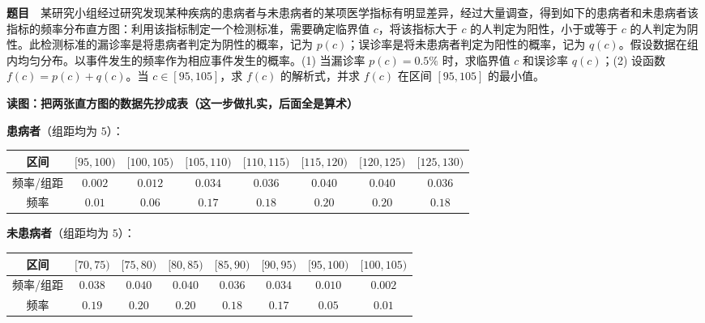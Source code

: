 \par\medskip


\textbf{题目}　某研究小组经过研究发现某种疾病的患病者与未患病者的某项医学指标有明显差异，经过大量调查，得到如下的患病者和未患病者该指标的频率分布直方图：利用该指标制定一个检测标准，需要确定临界值 $c$，将该指标大于 $c$ 的人判定为阳性，小于或等于 $c$ 的人判定为阴性。此检测标准的漏诊率是将患病者判定为阴性的概率，记为 $p(c)$；误诊率是将未患病者判定为阳性的概率，记为 $q(c)$。假设数据在组内均匀分布。以事件发生的频率作为相应事件发生的概率。(1) 当漏诊率 $p(c)=0.5\%$ 时，求临界值 $c$ 和误诊率 $q(c)$；(2) 设函数 $f(c)=p(c)+q(c)$。当 $c\in[95,105]$，求 $f(c)$ 的解析式，并求 $f(c)$ 在区间 $[95,105]$ 的最小值。

\begin{center}\end{center}

\par\medskip

\textbf{读图：把两张直方图的数据先抄成表（这一步做扎实，后面全是算术）}

\textbf{患病者}（组距均为 $5$）：

\begin{center}
\begingroup\setlength{\tabcolsep}{4pt}
\begin{tabular}{cccccccc}
\toprule
区间 & $[95,100)$ & $[100,105)$ & $[105,110)$ & $[110,115)$ & $[115,120)$ & $[120,125)$ & $[125,130)$ \\
\midrule
频率/组距 & $0.002$ & $0.012$ & $0.034$ & $0.036$ & $0.040$ & $0.040$ & $0.036$ \\
频率 & $0.01$ & $0.06$ & $0.17$ & $0.18$ & $0.20$ & $0.20$ & $0.18$ \\
\bottomrule
\end{tabular}
\endgroup
\end{center}

\textbf{未患病者}（组距均为 $5$）：

\begin{center}
\begingroup\setlength{\tabcolsep}{4pt}
\begin{tabular}{cccccccc}
\toprule
区间 & $[70,75)$ & $[75,80)$ & $[80,85)$ & $[85,90)$ & $[90,95)$ & $[95,100)$ & $[100,105)$ \\
\midrule
频率/组距 & $0.038$ & $0.040$ & $0.040$ & $0.036$ & $0.034$ & $0.010$ & $0.002$ \\
频率 & $0.19$ & $0.20$ & $0.20$ & $0.18$ & $0.17$ & $0.05$ & $0.01$ \\
\bottomrule
\end{tabular}
\endgroup
\end{center}

